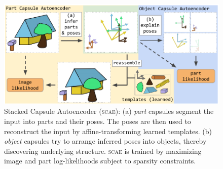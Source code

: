 \begin{figure}
    \centering
    \begin{minipage}[c]{0.68\linewidth}
        \centering
        \includegraphics[width=\linewidth]{figures/SCA/blocks_v4}
    \end{minipage}
    \hfill
    \begin{minipage}[c]{0.3\linewidth}
        \centering
        \caption{
            Stacked Capsule Autoencoder (\textsc{scae}):
            (a) \textit{part} capsules segment the input into parts and their poses. The poses are then used to reconstruct the input by affine-transforming learned templates.
            (b) \textit{object} capsules try to arrange inferred poses into objects, thereby discovering underlying structure.
            \textsc{scae} is trained by maximizing image and part log-likelihoods subject to sparsity constraints.
        }
        \label{fig:capsule_arch}
    \end{minipage}
    \vspace*{-.75em}
\end{figure}


